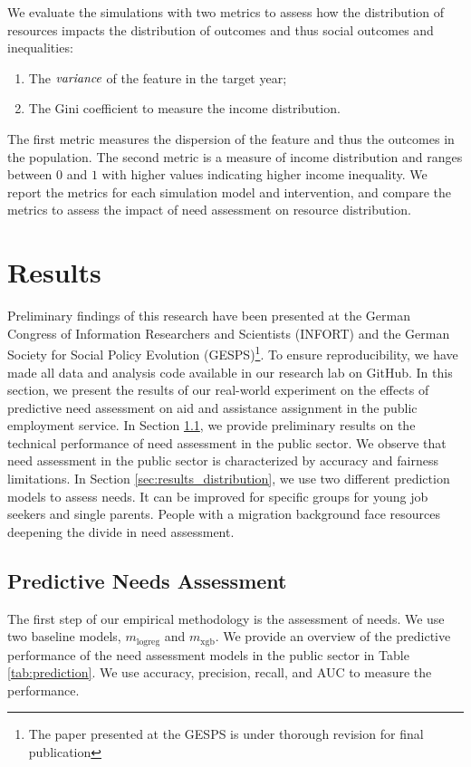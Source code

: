 \documentclass{article} %
\begin{document}
We evaluate the simulations with two metrics to assess how the distribution of resources impacts the distribution of outcomes and thus social outcomes and inequalities:
\begin{enumerate}
\item[(i)] The $\emph{variance}$ of the feature in the target year;
\item[(ii)] The Gini coefficient to measure the income distribution.
\end{enumerate}
The first metric measures the dispersion of the feature and thus the outcomes in the population. The second metric is a measure of income distribution and ranges between $0$ and $1$ with higher values indicating higher income inequality. We report the metrics for each simulation model and intervention, and compare the metrics to assess the impact of need assessment on resource distribution.


\section{Results}

\label{sec:results}
Preliminary findings of this research have been presented at the German Congress of Information Researchers and Scientists (INFORT) and the German Society for Social Policy Evolution (GESPS)\footnote{The paper presented at the GESPS is under thorough revision for final publication}. 
To ensure reproducibility, we have made all data and analysis code available in our research lab on GitHub. 
In this section, we present the results of our real-world experiment on the effects of predictive need assessment on aid and assistance assignment in the public employment service. In Section \ref{sec:results_accuracy}, we provide preliminary results on the technical performance of need assessment in the public sector. We observe that need assessment in the public sector is characterized by accuracy and fairness limitations. In Section \ref{sec:results_distribution}, we use two different prediction models to assess needs. It can be improved for specific groups for young job seekers and single parents. People with a migration background face resources deepening the divide in need assessment. 

\subsection{Predictive Needs Assessment}
\label{sec:results_accuracy}
The first step of our empirical methodology is the assessment of needs. We use two baseline models, $m_{\mathrm{logreg}}$ and $m_{\mathrm{xgb}}$. We provide an overview of the predictive performance of the need assessment models in the public sector in Table \ref{tab:prediction}. We use accuracy, precision, recall, and AUC to measure the performance.
\end{document}
